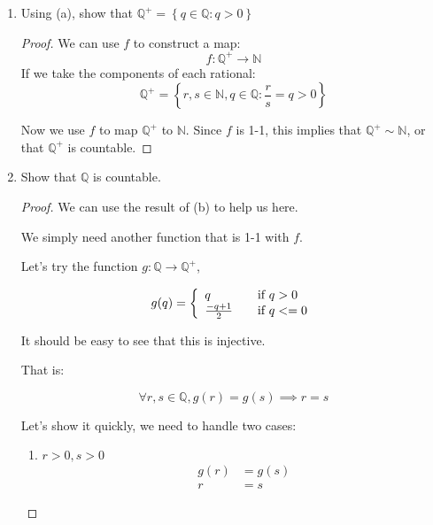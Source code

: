 \documentclass[12pt,letterpaper]{article}
\begin{document}
\begin{enumerate}
\begin{enumerate}
\begin{proof}
            So we have shown that \[\forall a, b, c, d \in \mathbb{N}, f(a,b) = f(c,d) \implies a = c \text{ and } b = d\]
            Thus $f$ is 1-1.
          \end{proof}

        \item Using (a), show that $\mathbb{Q}^+ = \left\{q \in \mathbb{Q} : q > 0 \right\}$

          \begin{proof}
            We can use $f$ to construct a map:
            \[f : \mathbb{Q}^+ \rightarrow \mathbb{N}\]
            If we take the components of each rational:
            \[\mathbb{Q}^+ = \left\{r, s \in \mathbb{N}, q \in \mathbb{Q} : \frac{r}{s} = q > 0 \right\}\]

            Now we use $f$ to map $\mathbb{Q}^+$ to $\mathbb{N}$.
            Since $f$ is 1-1, this implies that $\mathbb{Q}^+ \sim \mathbb{N}$,
            or that $\mathbb{Q}^+$ is countable.
          \end{proof}

        \item Show that $\mathbb{Q}$ is countable.

          \begin{proof}
            We can use the result of (b) to help us here.

            We simply need another function that is 1-1 with $f$.

            Let's try the function $g : \mathbb{Q} \rightarrow \mathbb{Q}^+$,

            \[
              g(q) = \left\{
                \begin{array}{l l}
                  q & \quad \text{if } q > 0\\
                  \frac{-q + 1}{2} & \quad \text{if } q <= 0
                \end{array} \right.
            \]

            It should be easy to see that this is injective.

            That is:

            \[\forall r, s \in \mathbb{Q}, g(r) = g(s) \implies r = s\]

            Let's show it quickly, we need to handle two cases:

            \begin{enumerate}
              \item $r > 0, s > 0$
                \begin{align*}
                  g(r) &= g(s) \\
                  r &= s
                \end{align*}


\end{enumerate}
\end{proof}
\end{enumerate}
\end{enumerate}
\end{document}
